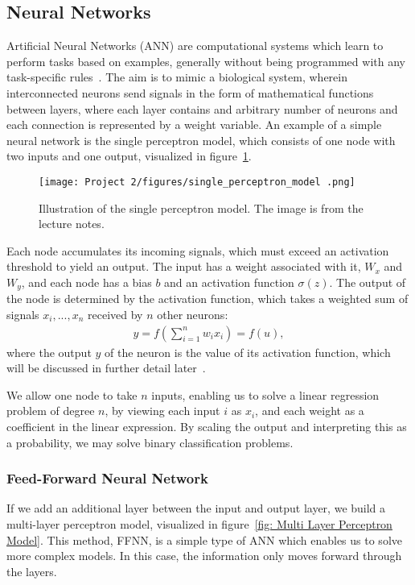 \documentclass[english,notitlepage,reprint,nofootinbib]{revtex4-2}  %
\begin{document}
\subsection*{Neural Networks}%
Artificial Neural Networks (ANN) are computational systems which learn to perform tasks based on examples, generally without being programmed with any task-specific rules~\cite{friedman}. 
The aim is to mimic a biological system, wherein interconnected neurons send signals in the form of mathematical functions between layers, where each layer contains and arbitrary number of neurons and each connection is represented by a weight variable. An example of a simple neural network is the single perceptron model, which consists of one node with two inputs and one output, visualized in figure~\ref{fig: Single Perceptron Model}. 

\begin{figure}[h!]
    \centering %
    \texttt{[image: Project 2/figures/single\_perceptron\_model .png]} 
    \caption{Illustration of the single perceptron model. The image is from the lecture notes.}
    \label{fig: Single Perceptron Model}
\end{figure}

Each node accumulates its incoming signals, which must exceed an activation threshold to yield an output. The input has a weight associated with it, $W_x$ and $W_y$, and each node has a bias $b$ and an activation function $\sigma(z)$. 
The output of the node is determined by the activation function, which takes a weighted sum of signals $x_i,...,x_n$ received by $n$ other neurons: 
\begin{align}
    y = f\left(\sum\limits_{i=1}^n w_i x_i\right) = f(u), 
\end{align}
where the output $y$ of the neuron is the value of its activation function, which will be discussed in further detail later~\cite{lecture_notes}. %

We allow one node to take $n$ inputs, enabling us to solve a linear regression problem of degree $n$, by viewing each input $i$ as $x_i$, and each weight as a coefficient in the linear expression. By scaling the output and interpreting this as a probability, we may solve binary classification problems. 


\subsubsection*{Feed-Forward Neural Network}
If we add an additional layer between the input and output layer, we build a multi-layer perceptron model, visualized in figure~\ref{fig: Multi Layer Perceptron Model}. This method, FFNN, is a simple type of ANN which enables us to solve more complex models. In this case, the information only moves forward through the layers. %
\end{document}
